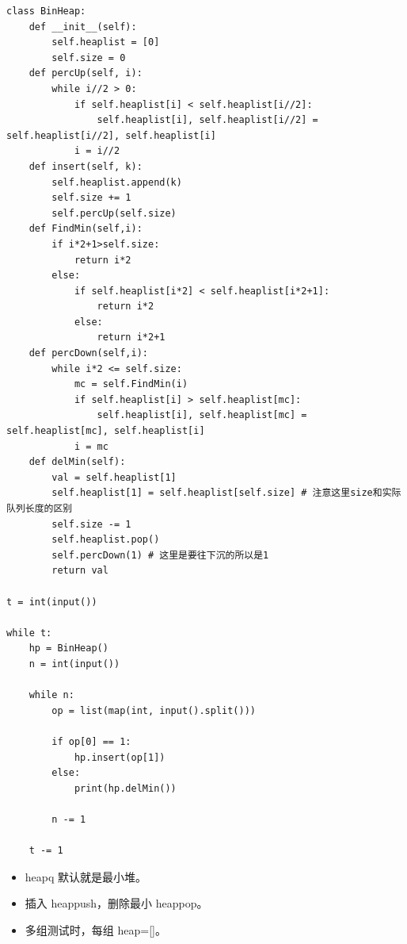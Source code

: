 \documentclass[10pt,a4paper,fontset=none]{ctexart}
\begin{document}
\begin{lstlisting}[style=py,caption={最终可用代码（对话来源）}]
class BinHeap:
    def __init__(self):
        self.heaplist = [0]
        self.size = 0
    def percUp(self, i):
        while i//2 > 0:
            if self.heaplist[i] < self.heaplist[i//2]:
                self.heaplist[i], self.heaplist[i//2] = self.heaplist[i//2], self.heaplist[i]
            i = i//2
    def insert(self, k):
        self.heaplist.append(k)
        self.size += 1
        self.percUp(self.size)
    def FindMin(self,i):
        if i*2+1>self.size:
            return i*2
        else:
            if self.heaplist[i*2] < self.heaplist[i*2+1]:
                return i*2
            else:
                return i*2+1
    def percDown(self,i):
        while i*2 <= self.size:
            mc = self.FindMin(i)
            if self.heaplist[i] > self.heaplist[mc]:
                self.heaplist[i], self.heaplist[mc] = self.heaplist[mc], self.heaplist[i]
            i = mc
    def delMin(self):
        val = self.heaplist[1]
        self.heaplist[1] = self.heaplist[self.size] # 注意这里size和实际队列长度的区别
        self.size -= 1
        self.heaplist.pop()
        self.percDown(1) # 这里是要往下沉的所以是1
        return val
    
t = int(input())

while t:
    hp = BinHeap()
    n = int(input())

    while n:
        op = list(map(int, input().split()))

        if op[0] == 1:
            hp.insert(op[1])
        else:
            print(hp.delMin())

        n -= 1

    t -= 1
\end{lstlisting}
\begin{notebox}
\begin{itemize}
  \item heapq 默认就是最小堆。
  \item 插入 heappush，删除最小 heappop。
  \item 多组测试时，每组 heap=[]。
\end{itemize}
\end{notebox}
\end{document}
